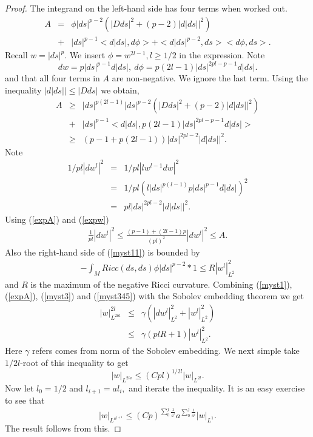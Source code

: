 \documentclass{ip-journal}
\theoremstyle{definition}
\numberwithin{equation}{section}
\begin{document}
\begin{proof}
The integrand on the left-hand side has four terms when worked out.
\begin{eqnarray*}
A &=& \phi |ds|^{p-2}(|Dds|^2 +(p-2)|d|ds||^2) \\
&+& |ds|^{p-1}<d|ds|,d\phi>+ <d|ds|^{p-2},ds><d\phi,ds>.
\end{eqnarray*}
Recall $w = |ds|^p.$ We insert $\phi = w^{2l-1}, l\geq1/2$ in the expression.  Note
\[
dw = p|ds|^{p-1}d|ds|, \ d\phi = p(2l-1)|ds|^{2pl-p-1}d|ds|.
\]
and that all four terms in  $A$ are non-negative. We ignore the last term.
Using  the inequality $|d|ds|| \leq |D ds|$ we obtain,
\begin{eqnarray}\label{expA}
A &\geq&  |ds|^{p(2l-1)} |ds|^{p-2}(|D ds|^2 +(p-2)|d|ds||^2)  \nonumber\\
&+& |ds|^{p-1}<d|ds|,p(2l-1)|ds|^{2pl-p-1}d|ds|> \\
   &\geq&(p-1+p(2l-1))|ds|^{2pl-2}|d|ds||^2.  \nonumber
   \end{eqnarray}
   Note
\begin{eqnarray}\label{expw}
1/pl |dw^l|^2 &=&1/pl|lw^{l-1}dw|^2  \nonumber\\
&=&1/pl (l |ds|^{p(l-1)} p|ds|^{p-1}d|ds|)^2\\
&=& pl |ds|^{2pl-2}|d|ds||^2.  \nonumber
   \end{eqnarray}
 Using (\ref{expA}) and (\ref{expw})
 \begin{eqnarray}\label{myst3}
 \frac{1}{pl} |dw^l|^2 \leq \frac{(p-1) +(2l-1)p}{(pl)^2} |dw^l|^2 \leq A.
\end{eqnarray}
Also the right-hand side of (\ref{myst11}) is bounded
by
 \begin{eqnarray}\label{myst345}
 - \int_M  Ricc(ds,ds)\phi |ds|^{p-2}*1 \leq R |w^l|_{L^2}^2
 \end{eqnarray}
 and $R$ is the maximum of the negative Ricci curvature.
Combining (\ref{myst1}), (\ref{expA}), (\ref{myst3}) and (\ref{myst345}) with the Sobolev embedding theorem we get
\begin{eqnarray*}\label{myst4}
|w|_{L^{2la}}^{2l} &\leq& \gamma (|dw^l|_{L^2}^2 + |w^l|_{L^2}^2  )\\
&\leq& \gamma (pl R + 1) |w^l|_{L^2}^2 .
\end{eqnarray*}
Here $\gamma$ refers comes from norm of the Sobolev embedding.  We next simple take $1/2l$-root of this inequality to get
\[
      |w|_{L^{2la}} \leq (Cpl)^{1/2l} |w|_{L^{2l}}.
\]
Now let $l_0 = 1/2$ and $l_{i+1} = a l_i,$ and iterate the inequality. It is an easy exercise to see that 
\[
   |w|_{L^{a^{j+1}}} \leq (Cp)^{\sum_0^j  \frac{1}{a^i}} a^{\sum_0^j   \frac{i}{a^i}} |w|_{L^1}.
\]
The result follows from this.
\end{proof}
\end{document}
